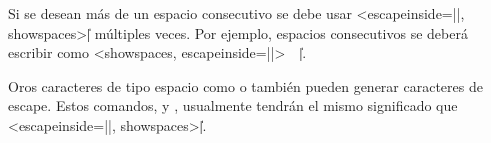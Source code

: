 Si se desean más de un espacio consecutivo se debe usar \texline<escapeinside=||, showspaces>{\| |} múltiples veces. Por ejemplo, espacios consecutivos se deberá escribir como \texline<showspaces, escapeinside=||>{\ \ \| |}.

Oros caracteres de tipo espacio como  o  también pueden generar caracteres de escape. Estos comandos, \texline{\ } y \texline{\ }, usualmente tendrán el mismo significado que \texline<escapeinside=||, showspaces>{\| |}.


